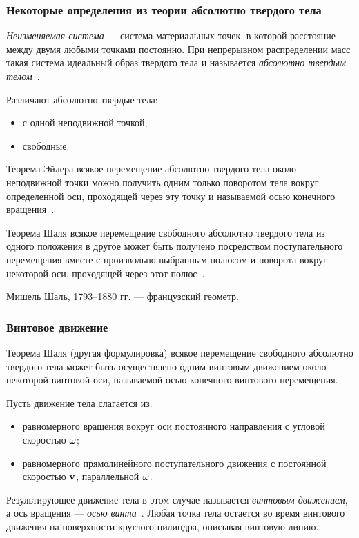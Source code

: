 \begin{frame}
  \frametitle{Некоторые определения из теории абсолютно твердого тела}
  
  \emph{Неизменяемая система} — система материальных точек, в которой расстояние между двумя любыми точками постоянно. При непрерывном распределении масс такая система идеальный образ твердого тела и называется \emph{абсолютно твердым телом}~\cite[48]{Buhgoltz1965}.

  Различают абсолютно твердые тела:
  \begin{itemize}
    \item с одной неподвижной точкой,
    \item свободные.
  \end{itemize}
  
  \begin{block}{Теорема Эйлера}
    всякое перемещение абсолютно твердого тела около неподвижной точки можно получить одним только поворотом тела вокруг определенной оси, проходящей через эту точку и называемой осью конечного вращения~\cite[132]{Buhgoltz1965}.
  \end{block}

  \begin{block}{Теорема Шаля}
    всякое перемещение свободного абсолютно твердого тела из одного положения в другое может быть получено посредством поступательного перемещения вместе с произвольно выбранным полюсом и поворота вокруг некоторой оси, проходящей через этот полюс~\cite[153]{Buhgoltz1965}.
  \end{block}
  Мишель Шаль, 1793--1880 гг. — французский геометр.
\end{frame}

\begin{frame}
  \frametitle{Винтовое движение}
  \begin{block}{Теорема Шаля (другая формулировка)}
    всякое перемещение свободного абсолютно твердого тела может быть осуществлено одним винтовым движением около некоторой винтовой оси, называемой осью конечного винтового перемещения.
  \end{block}

  Пусть движение тела слагается из:
  \begin{itemize}
    \item равномерного вращения вокруг оси постоянного направления с угловой скоростью $\vb{\omega}$;
    \item равномерного прямолинейного поступательного движения с постоянной скоростью $\vb{v}$, параллельной $\vb{\omega}$.
  \end{itemize}
  Результирующее движение тела в этом случае называется \emph{винтовым движением}, а ось вращения — \emph{осью винта}~\cite[146]{Buhgoltz1965}. Любая точка тела остается во время винтового движения на поверхности круглого цилиндра, описывая винтовую линию.
\end{frame}


